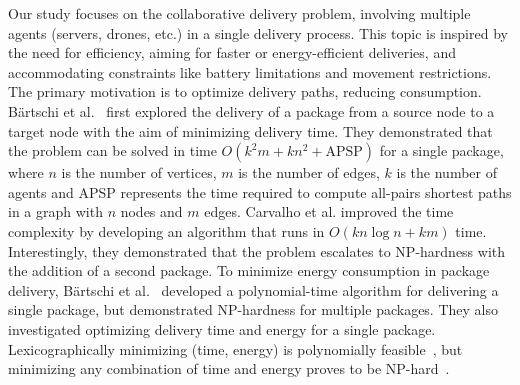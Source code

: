Our study focuses on the collaborative delivery problem, involving multiple agents (servers, drones, etc.) in a single delivery process. This topic is inspired by the need for efficiency, aiming for faster or energy-efficient deliveries,   and accommodating constraints like battery limitations and movement restrictions. The primary motivation is to optimize delivery paths, reducing consumption. 
Bärtschi et al.~\cite{bartschi2018} first explored the delivery of a package from a source node to a target node with the aim of minimizing delivery time. They demonstrated that the problem can be solved in 
 time $O(k^2m+kn^2+\text{APSP})$ for a single package, where $n$ is the number of vertices, $m$ is the number of edges, $k$ is the number of agents and APSP represents the time required to compute all-pairs shortest paths in a graph with $n$ nodes and $m$ edges. 
 Carvalho et al. \cite{carvalho2021fast} improved the time complexity by developing an algorithm that runs in $O(kn \log n + km)$ time. Interestingly, they demonstrated that the problem escalates to NP-hardness with the addition of a second package.  To minimize energy consumption in package delivery, Bärtschi et al.~\cite{bartschi2018} developed a polynomial-time algorithm for delivering a single package, but demonstrated NP-hardness for multiple packages. They also investigated optimizing delivery time and energy for a single package. Lexicographically minimizing (time, energy) is polynomially feasible~\cite{bartschi2017energy}, but minimizing any combination of time and energy proves to be NP-hard~\cite{bartschi2018}.


